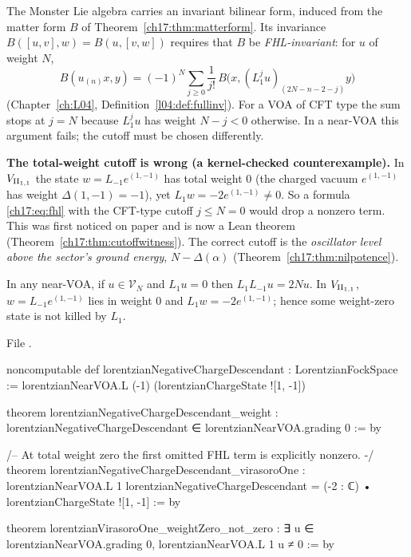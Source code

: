 The Monster Lie algebra carries an invariant bilinear form, induced from the matter form $B$ of
Theorem~\ref{ch17:thm:matterform}.  Its invariance $B([u,v],w)=B(u,[v,w])$ requires that $B$ be \emph{FHL-invariant}:
for $u$ of weight $N$,
\begin{equation}\label{ch17:eq:fhl}
  B(u_{(n)}x,y)=(-1)^N\sum_{j\ge0}\frac1{j!}\,B\bigl(x,(L_1^ju)_{(2N-n-2-j)}y\bigr)
\end{equation}
(Chapter~\ref{ch:L04}, Definition~\ref{l04:def:fullinv}).  For a VOA of CFT type the sum stops at $j=N$ because
$L_1^ju$ has weight $N-j<0$ otherwise.  In a near-VOA this argument fails; the cutoff must be chosen differently.

\begin{warning}
\textbf{The total-weight cutoff is wrong (a kernel-checked counterexample).}  In ${V_{\mathrm{II}_{1,1}}}$ the state
$w=L_{-1}e^{(1,-1)}$ has total weight $0$ (the charged vacuum $e^{(1,-1)}$ has weight $\Delta(1,-1)=-1$), yet
$L_1w=-2e^{(1,-1)}\neq0$.  So a formula \eqref{ch17:eq:fhl} with the CFT-type cutoff $j\le N=0$ would drop a nonzero term.
This was first noticed on paper and is now a Lean theorem
(Theorem~\ref{ch17:thm:cutoffwitness}).  The correct cutoff is the \emph{oscillator level above the sector's ground
energy}, $N-\Delta(\alpha)$ (Theorem~\ref{ch17:thm:nilpotence}).
\end{warning}

\begin{theorem}\label{ch17:thm:cutoffwitness}
In any near-VOA, if $u\in\mathcal V_N$ and $L_1u=0$ then $L_1L_{-1}u=2N u$.  In ${V_{\mathrm{II}_{1,1}}}$, $w=L_{-1}e^{(1,-1)}$ lies in weight $0$
and $L_1w=-2e^{(1,-1)}$; hence some weight-zero state is not killed by $L_1$.
\end{theorem}

\noindent File .
\begin{leancode}
noncomputable def lorentzianNegativeChargeDescendant : LorentzianFockSpace :=
  lorentzianNearVOA.L (-1) (lorentzianChargeState ![1, -1])

theorem lorentzianNegativeChargeDescendant_weight :
    lorentzianNegativeChargeDescendant ∈ lorentzianNearVOA.grading 0 := by

/-- At total weight zero the first omitted FHL term is explicitly nonzero. -/
theorem lorentzianNegativeChargeDescendant_virasoroOne :
    lorentzianNearVOA.L 1 lorentzianNegativeChargeDescendant =
      (-2 : ℂ) • lorentzianChargeState ![1, -1] := by

theorem lorentzianVirasoroOne_weightZero_not_zero :
    ∃ u ∈ lorentzianNearVOA.grading 0, lorentzianNearVOA.L 1 u ≠ 0 := by
\end{leancode}

